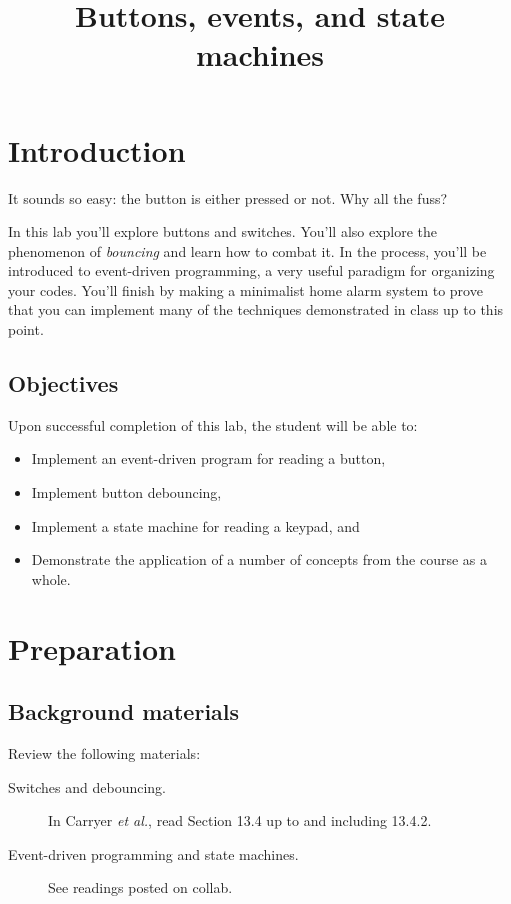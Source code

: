 \documentclass[11pt]{article} %
\title{Buttons, events, and state machines}
\author{}
\date{} %
\begin{document}
\maketitle


\section*{Introduction}

It sounds so easy: the button is either pressed or not. Why all the fuss?

In this lab you’ll explore buttons and switches. You’ll also explore the phenomenon of \emph{bouncing} and learn how to combat it. In the process, you’ll be introduced to event-driven programming, a very useful paradigm for organizing your codes. You’ll finish by making a minimalist home alarm system to prove that you can implement many of the techniques demonstrated in class up to this point.

\subsection*{Objectives}

Upon successful completion of this lab, the student will be able to:
\begin{itemize}
\item Implement an event-driven program for reading a button,
\item Implement button debouncing, 
\item Implement a state machine for reading a keypad, and
\item Demonstrate the application of a number of concepts from the course as a whole.
\end{itemize}

\section*{Preparation}
\subsection*{Background materials}

Review the following materials:
\begin{description}
\item [Switches and debouncing.] In Carryer \emph{et al.}, read Section 13.4 up to and including 13.4.2.
\item [Event-driven programming and state machines.] See readings posted on collab.
\end{description}
\end{document}
